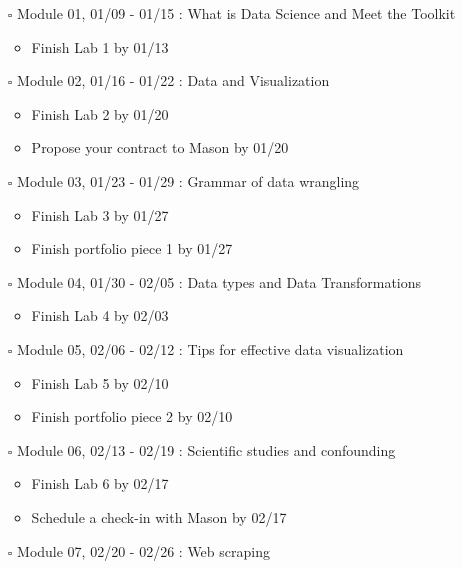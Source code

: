 \documentclass[
]{article}
\providecommand{\tightlist}{%
  \setlength{\itemsep}{0pt}\setlength{\parskip}{0pt}}
\begin{document}
\begin{itemize}
\item[$\square$]
  Module 01, 01/09 - 01/15 : What is Data Science and Meet the Toolkit

  \begin{itemize}
  \tightlist
  \item
    Finish Lab 1 by 01/13
  \end{itemize}
\item[$\square$]
  Module 02, 01/16 - 01/22 : Data and Visualization

  \begin{itemize}
  \tightlist
  \item
    Finish Lab 2 by 01/20
  \item
    Propose your contract to Mason by 01/20
  \end{itemize}
\item[$\square$]
  Module 03, 01/23 - 01/29 : Grammar of data wrangling

  \begin{itemize}
  \tightlist
  \item
    Finish Lab 3 by 01/27
  \item
    Finish portfolio piece 1 by 01/27
  \end{itemize}
\item[$\square$]
  Module 04, 01/30 - 02/05 : Data types and Data Transformations

  \begin{itemize}
  \tightlist
  \item
    Finish Lab 4 by 02/03
  \end{itemize}
\item[$\square$]
  Module 05, 02/06 - 02/12 : Tips for effective data visualization

  \begin{itemize}
  \tightlist
  \item
    Finish Lab 5 by 02/10
  \item
    Finish portfolio piece 2 by 02/10
  \end{itemize}
\item[$\square$]
  Module 06, 02/13 - 02/19 : Scientific studies and confounding

  \begin{itemize}
  \tightlist
  \item
    Finish Lab 6 by 02/17
  \item
    Schedule a check-in with Mason by 02/17
  \end{itemize}
\item[$\square$]
  Module 07, 02/20 - 02/26 : Web scraping


\end{itemize}
\end{document}
